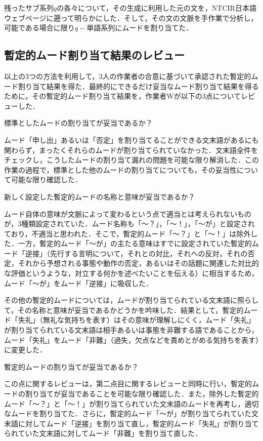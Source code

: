 \documentclass[japanese]{jnlp_1.4}
\newcommand{\InHone}[1]{}
\begin{document}
\InHone{(5)} 
残ったサブ系列$q$の各々について，その生成に利用した元の文を，NTCIR日本語ウェブページに遡って明らかにした．そして，その文の文脈を手作業で分析し，可能である場合に限り$q-$単語系列にムードを割り当てた．

\subsection{暫定的ムード割り当て結果のレビュー}

以上の3つの方法を利用して，3人の作業者の合意に基づいて承認された暫定的ムード割り当て結果を得た．最終的にできるだけ妥当なムード割り当て結果を得るために，その暫定的ムード割り当て結果を，作業者Wが以下の3点についてレビューした．

\InHone{(1)}
標準としたムードの割り当てが妥当であるか？

ムード「申し出」あるいは「否定」を割り当てることができる文末語があるにも関わらず，まったくそれらのムードが割り当てられていなかった．文末語全件をチェックし，こうしたムードの割り当て漏れの問題を可能な限り解消した．この作業の過程で，標準とした他のムードの割り当てについても，その妥当性について可能な限り確認した．

\InHone{(2)}
新しく設定した暫定的ムードの名称と意味が妥当であるか？

ムード自体の意味が文脈によって変わるという点で適当とは考えられないものが，3種類設定されていた．ムード名称も「〜？」，「〜！」，「〜が」と設定されており，不適当と思われた．そこで，暫定的ムード「〜？」と「〜！」は除外した．一方，暫定的ムード「〜が」の主たる意味はすでに設定されていた暫定的ムード「逆接」（先行する言明について，それとの対比，それへの反対，それの否定，それから予想される事態や動作の否定，あるいはその話題に関連した対比的な評価というような，対立する何かを述べたいことを伝える）に相当するため，ムード「〜が」をムード「逆接」に吸収した．

その他の暫定的ムードについては，ムードが割り当てられている文末語に照らして，その名称と意味が妥当であるかどうかを吟味した．結果として，暫定的ムード「失礼」（無礼な気持ちを表す）はその意味が理解しにくく，ムード「失礼」が割り当てられている文末語は相手あるいは事態を非難する語であることから，ムード「失礼」をムード「非難」（過失，欠点などを責めとがめる気持ちを表す）に変更した．

\InHone{(3)}
暫定的ムードの割り当てが妥当であるか？

この点に関するレビューは，第二点目に関するレビューと同時に行い，暫定的ムードの割り当てが妥当であることを可能な限り確認した．また，除外した暫定的ムード「〜？」と「〜！」が割り当てられていた文末語のムードを再考し，適切なムードを割り当てた．さらに，暫定的ムード「〜が」が割り当てられていた文末語に対してムード「逆接」を割り当て直し，暫定的ムード「失礼」が割り当てられていた文末語に対してムード「非難」を割り当て直した．
\end{document}
